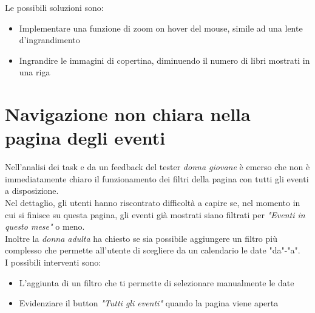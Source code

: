 \documentclass[12pt,a4paper,oneside]{report}
\begin{document}
Le possibili soluzioni sono:

\begin{itemize}
	\item Implementare una funzione di zoom on hover del mouse, simile ad una lente d'ingrandimento
	\item Ingrandire le immagini di copertina, diminuendo il numero di libri mostrati in una riga
\end{itemize}

\section{Navigazione non chiara nella pagina degli eventi}

Nell'analisi dei task e da un feedback del tester \textit{donna giovane} è emerso che non è immediatamente chiaro il funzionamento dei filtri della pagina con tutti gli eventi a disposizione. \\
Nel dettaglio, gli utenti hanno riscontrato difficoltà a capire se, nel momento in cui si finisce su questa pagina, gli eventi già mostrati siano filtrati per \textit{"Eventi in questo mese"} o meno. \\
Inoltre la \textit{donna adulta} ha chiesto se sia possibile aggiungere un filtro più complesso che permette all'utente di scegliere da un calendario le date "da"-"a". \\

I possibili interventi sono:

\begin{itemize}
	\item L'aggiunta di un filtro che ti permette di selezionare manualmente le date
	\item Evidenziare il button \textit{"Tutti gli eventi"} quando la pagina viene aperta
\end{itemize}
\end{document}
